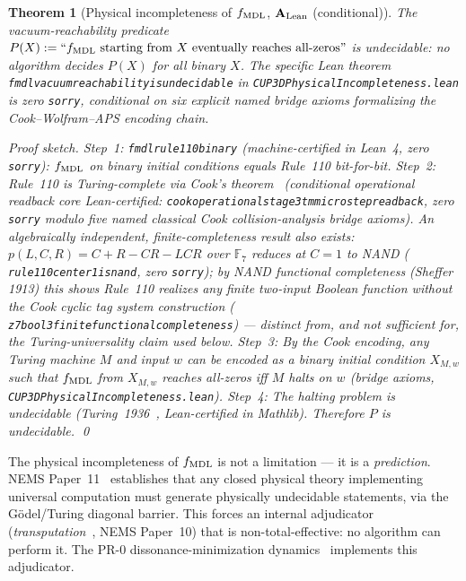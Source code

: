\documentclass[11pt]{article}
\newtheorem{theorem}{Theorem}[section]
\theoremstyle{remark}
\newcommand{\lean}[1]{%
  \penalty-100
  \begingroup\def\_{\textunderscore\allowbreak}\texttt{#1}\endgroup}
\newcommand{\CatAL}{\ensuremath{\textbf{A}_{\rm Lean}}}
\begin{document}
\begin{theorem}[Physical incompleteness of $f_{\rm MDL}$, $\CatAL$ (conditional)]
\label{thm:incomplete}
The vacuum-reachability predicate $P(X) := \text{``}f_{\rm MDL}\text{ starting from }X
\text{ eventually reaches all-zeros''}$ is undecidable: no algorithm decides $P(X)$
for all binary $X$.
The specific Lean theorem \lean{fmdl\_vacuum\_reachability\_is\_undecidable} in
\lean{CUP3DPhysicalIncompleteness.lean} is zero \texttt{sorry}, conditional on six
explicit named bridge axioms formalizing the Cook--Wolfram--APS encoding chain.
\begin{proof}[Proof sketch]
Step~1: \lean{fmdl\_rule110\_binary} (machine-certified in Lean~4, zero \texttt{sorry}):
$f_{\rm MDL}$ on binary initial conditions equals Rule~110 bit-for-bit.
Step~2: Rule~110 is Turing-complete via Cook's theorem~\cite{Cook2004,Cook2009,Spivack2025_UGPDynamicsUniversality}
(conditional operational readback core Lean-certified:
\lean{cook\_operational\_stage3\_tm\_microstep\_readback}, zero \texttt{sorry}
modulo five named classical Cook collision-analysis bridge axioms). An algebraically
independent, finite-completeness result also exists:
$p(L,C,R)=C+R-CR-LCR$ over $\mathbb{F}_7$ reduces at $C=1$ to NAND
(\lean{rule110\_center1\_is\_nand}, zero \texttt{sorry}); by NAND functional
completeness (Sheffer 1913) this shows Rule~110 realizes any finite two-input
Boolean function without the Cook cyclic tag system construction
(\lean{z7\_bool3\_finite\_functional\_completeness}) --- distinct from, and not
sufficient for, the Turing-universality claim used below.
Step~3: By the Cook encoding, any Turing machine $M$ and input $w$ can be encoded as a
binary initial condition $X_{M,w}$ such that $f_{\rm MDL}$ from $X_{M,w}$ reaches
all-zeros iff $M$ halts on $w$ (bridge axioms, \lean{CUP3DPhysicalIncompleteness.lean}).
Step~4: The halting problem is undecidable (Turing~1936~\cite{Turing1936}, Lean-certified in Mathlib).
Therefore $P$ is undecidable. \qed
\end{proof}
\end{theorem}

The physical incompleteness of $f_{\rm MDL}$ is not a limitation --- it is a
\emph{prediction}. NEMS Paper~11~\cite{SpivackUGP2024} establishes that any closed
physical theory implementing universal computation must generate physically undecidable
statements, via the G\"{o}del/Turing diagonal barrier. This forces an internal
adjudicator (\emph{transputation}~\cite{SpivackUGP2025}, NEMS Paper~10) that is
non-total-effective: no algorithm can perform it. The PR-0 dissonance-minimization
dynamics~\cite{SpivackUGPDynamics} implements this adjudicator.
\end{document}
